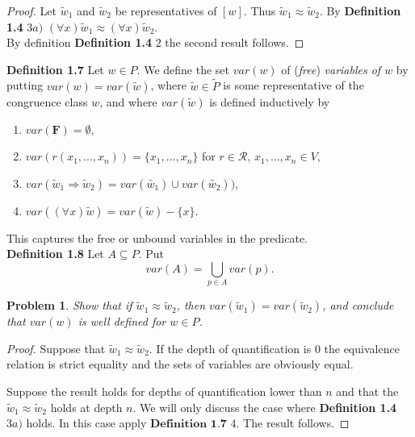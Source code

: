 \documentclass{article}
\theoremstyle{problemstyle}
\newtheorem{problem}{Problem}
\theoremstyle{lemmastyle}
\theoremstyle{theoremstyle}
\theoremstyle{problemstyle}
\begin{document}
\begin{proof}
Let $\widetilde{w}_1$ and $\widetilde{w}_2$ be representatives of $[w]$. Thus $\widetilde{w}_1 \approx \widetilde{w}_2$. By \textbf{Definition 1.4} $3a)$ $(\forall x)\widetilde{w}_1 \approx (\forall x)\widetilde{w}_2$.\\

By definition  \textbf{Definition 1.4} $2$ the second result follows. 
\end{proof}

\textbf{Definition 1.7} Let $w \in P$. We define the set $var(w)$ of (\textit{free}) \textit{variables of $w$} by putting $var(w) = var(\widetilde{w})$, where $\widetilde{w} \in \widetilde{P}$ is some representative of the congruence class $w$, and where $var(\widetilde{w})$ is defined inductively by 
\begin{enumerate}
\item $var(\textbf{F}) = \emptyset$,
\item $var(r(x_1,...,x_n)) = \{x_1,...,x_n\}$ for $r \in \mathscr{R}$, $x_1,...,x_n \in V$,
\item $var(\widetilde{w}_1 \Rightarrow \widetilde{w}_2) = var(\widetilde{w_1})\cup var(\widetilde{w_2}))$,
\item $var((\forall x)\widetilde{w}) = var(\widetilde{w})-\{x\}$.
\end{enumerate}

This captures the free or unbound variables in the predicate.\\ 

\textbf{Definition 1.8} Let $A \subseteq P$. Put $$var(A) = \bigcup_{p \in A}var(p).$$

\begin{problem}
Show that if $\widetilde{w}_1 \approx \widetilde{w}_2$, then $var(\widetilde{w}_1) = var(\widetilde{w}_2)$, and conclude that $var(w)$ is well defined for $w \in P$. 
\end{problem}

\begin{proof}
Suppose that $\widetilde{w}_1 \approx \widetilde{w}_2$. If the depth of quantification is $0$ the equivalence relation is strict equality and the sets of variables are obviously equal. 

Suppose the result holds for depths of quantification lower than $n$ and that the $\widetilde{w}_1 \approx \widetilde{w}_2$ holds at depth $n$. We will only discuss the case where \textbf{Definition 1.4} $3a)$ holds. In this case apply $\textbf{Definition 1.7}$ $4.$ The result follows. 
\end{proof}
\end{document}
